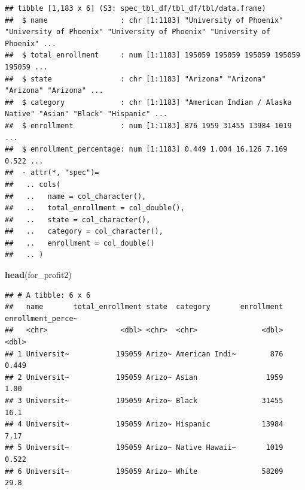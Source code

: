 \documentclass[
]{article}
\newenvironment{Shaded}{\begin{snugshade}}{\end{snugshade}}
\newcommand{\KeywordTok}[1]{\textcolor[rgb]{0.13,0.29,0.53}{\textbf{#1}}}
\newcommand{\NormalTok}[1]{#1}
\begin{document}
\begin{verbatim}
## tibble [1,183 x 6] (S3: spec_tbl_df/tbl_df/tbl/data.frame)
##  $ name                 : chr [1:1183] "University of Phoenix" "University of Phoenix" "University of Phoenix" "University of Phoenix" ...
##  $ total_enrollment     : num [1:1183] 195059 195059 195059 195059 195059 ...
##  $ state                : chr [1:1183] "Arizona" "Arizona" "Arizona" "Arizona" ...
##  $ category             : chr [1:1183] "American Indian / Alaska Native" "Asian" "Black" "Hispanic" ...
##  $ enrollment           : num [1:1183] 876 1959 31455 13984 1019 ...
##  $ enrollment_percentage: num [1:1183] 0.449 1.004 16.126 7.169 0.522 ...
##  - attr(*, "spec")=
##   .. cols(
##   ..   name = col_character(),
##   ..   total_enrollment = col_double(),
##   ..   state = col_character(),
##   ..   category = col_character(),
##   ..   enrollment = col_double()
##   .. )
\end{verbatim}

\begin{Shaded}
\begin{Highlighting}[]
\KeywordTok{head}\NormalTok{(for_profit2)}
\end{Highlighting}
\end{Shaded}

\begin{verbatim}
## # A tibble: 6 x 6
##   name       total_enrollment state  category       enrollment enrollment_perce~
##   <chr>                 <dbl> <chr>  <chr>               <dbl>             <dbl>
## 1 Universit~           195059 Arizo~ American Indi~        876             0.449
## 2 Universit~           195059 Arizo~ Asian                1959             1.00 
## 3 Universit~           195059 Arizo~ Black               31455            16.1  
## 4 Universit~           195059 Arizo~ Hispanic            13984             7.17 
## 5 Universit~           195059 Arizo~ Native Hawaii~       1019             0.522
## 6 Universit~           195059 Arizo~ White               58209            29.8
\end{verbatim}
\end{document}
